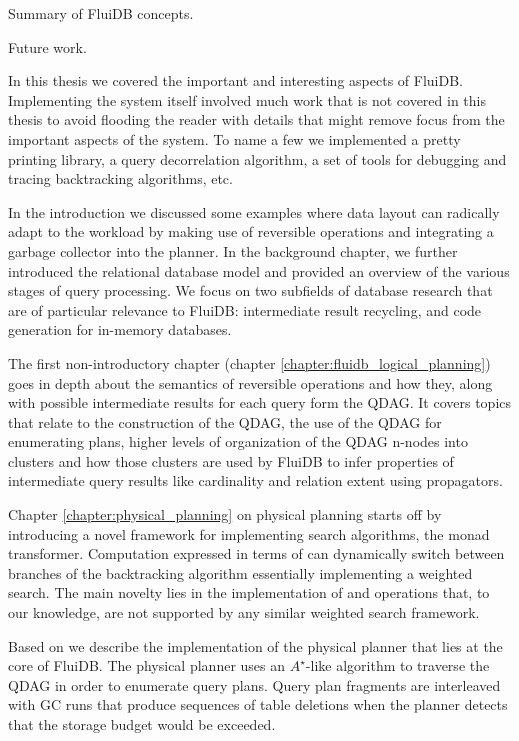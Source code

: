 
\begin{summary}
\item Summary of FluiDB concepts.
\item Future work.
\end{summary}


In this thesis we covered the important and interesting aspects of
FluiDB. Implementing the system itself involved much work that is not
covered in this thesis to avoid flooding the reader with details that
might remove focus from the important aspects of the system. To name a
few we implemented a pretty printing library, a query decorrelation
algorithm, a set of tools for debugging and tracing backtracking
algorithms, etc.

In the introduction we discussed some examples where data layout can
radically adapt to the workload by making use of reversible operations
and integrating a garbage collector into the planner. In the
background chapter, we further introduced the relational database
model and provided an overview of the various stages of query
processing. We focus on two subfields of database research that are of
particular relevance to FluiDB: intermediate result recycling, and
code generation for in-memory databases.

The first non-introductory chapter (chapter
\ref{chapter:fluidb_logical_planning}) goes in depth about the
semantics of reversible operations and how they, along with possible
intermediate results for each query form the QDAG. It covers topics
that relate to the construction of the QDAG, the use of the QDAG for
enumerating plans, higher levels of organization of the QDAG n-nodes
into clusters and how those clusters are used by FluiDB to infer
properties of intermediate query results like cardinality and relation
extent using propagators.

Chapter \ref{chapter:physical_planning} on physical planning starts
off by introducing a novel framework for implementing search
algorithms, the  monad transformer. Computation expressed
in terms of  can dynamically switch between branches of
the backtracking algorithm essentially implementing a weighted
search. The main novelty lies in the implementation of 
and  operations that, to our knowledge, are not
supported by any similar weighted search framework.

Based on  we describe the implementation of the physical
planner that lies at the core of FluiDB. The physical planner uses an
\(A^{\star}\)-like algorithm to traverse the QDAG in order to
enumerate query plans. Query plan fragments are interleaved with GC
runs that produce sequences of table deletions when the planner
detects that the storage budget would be exceeded.

